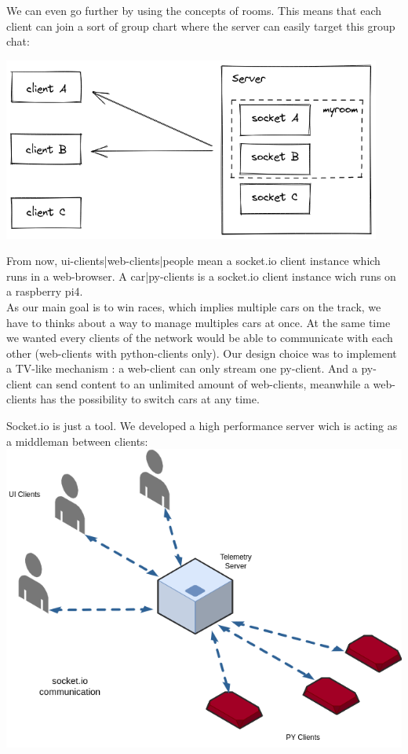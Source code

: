 \documentclass[12pt]{article}
\begin{document}
We can even go further by using the concepts of rooms. This means that each client can join a sort of group chart where the server can easily target this group chat:\\


\centerline{\includegraphics[height=6cm]{../../docs/rooms.png}}

From now, ui-clients|web-clients|people mean a socket.io client instance which runs in a web-browser. A car|py-clients is a socket.io client instance wich runs on a raspberry pi4.\\ 
As our main goal is to win races, which implies multiple cars on the track, we have to thinks about a way to manage multiples cars at once. At the same time we wanted every clients of the network would be able to communicate with each other (web-clients with python-clients only). Our design choice was to implement a TV-like mechanism : a web-client can only stream one py-client. And a py-client can send content to an unlimited amount of web-clients, meanwhile a web-clients has the possibility to switch cars at any time.\\ 

\newpage 

Socket.io is just a tool. We developed a high performance server wich is acting as a middleman between clients:\\

\includegraphics[width=\textwidth]{../../docs/diagram.png}
\end{document}
